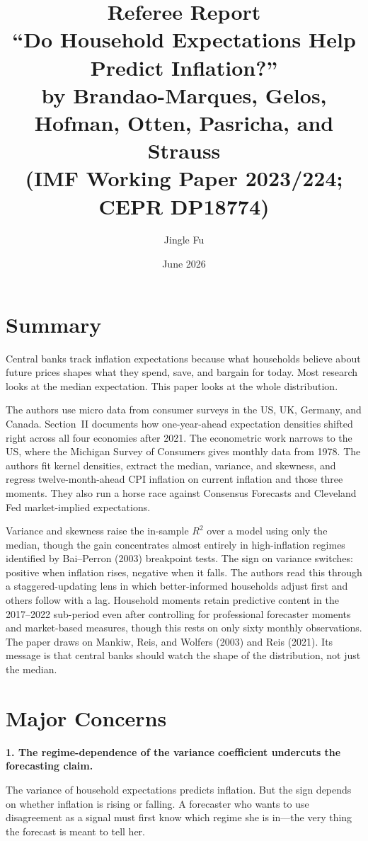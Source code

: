 \documentclass[11pt, a4paper]{article}
\title{\vspace{-2em}\textbf{Referee Report} \\[0.3em]
\large ``Do Household Expectations Help Predict Inflation?'' \\
by Brandao-Marques, Gelos, Hofman, Otten, Pasricha, and Strauss \\
(IMF Working Paper 2023/224; CEPR DP18774)\vspace{-1em}}
\author{Jingle Fu}
\date{June 2026}
\begin{document}
\maketitle
\thispagestyle{empty}

\section{Summary}

Central banks track inflation expectations because what households believe about future prices shapes what they spend, save, and bargain for today. Most research looks at the median expectation. This paper looks at the whole distribution.

The authors use micro data from consumer surveys in the US, UK, Germany, and Canada. Section~II documents how one-year-ahead expectation densities shifted right across all four economies after 2021. The econometric work narrows to the US, where the Michigan Survey of Consumers gives monthly data from 1978. The authors fit kernel densities, extract the median, variance, and skewness, and regress twelve-month-ahead CPI inflation on current inflation and those three moments. They also run a horse race against Consensus Forecasts and Cleveland Fed market-implied expectations.

Variance and skewness raise the in-sample $R^2$ over a model using only the median, though the gain concentrates almost entirely in high-inflation regimes identified by Bai--Perron (2003) breakpoint tests. The sign on variance switches: positive when inflation rises, negative when it falls. The authors read this through a staggered-updating lens in which better-informed households adjust first and others follow with a lag. Household moments retain predictive content in the 2017--2022 sub-period even after controlling for professional forecaster moments and market-based measures, though this rests on only sixty monthly observations. The paper draws on Mankiw, Reis, and Wolfers (2003) and Reis (2021). Its message is that central banks should watch the shape of the distribution, not just the median.

\section{Major Concerns}

\textbf{1. The regime-dependence of the variance coefficient undercuts the forecasting claim.}

The variance of household expectations predicts inflation. But the sign depends on whether inflation is rising or falling. A forecaster who wants to use disagreement as a signal must first know which regime she is in---the very thing the forecast is meant to tell her.
\end{document}
